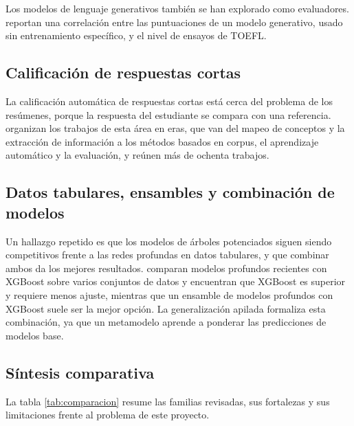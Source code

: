 \documentclass[11pt,a4paper]{article}
\begin{document}
Los modelos de lenguaje generativos también se han explorado como evaluadores. \citet{mizumoto2023} reportan una correlación entre las puntuaciones de un modelo generativo, usado sin entrenamiento específico, y el nivel de ensayos de TOEFL.

\subsection{Calificación de respuestas cortas}

La calificación automática de respuestas cortas está cerca del problema de los resúmenes, porque la respuesta del estudiante se compara con una referencia. \citet{burrows2015} organizan los trabajos de esta área en eras, que van del mapeo de conceptos y la extracción de información a los métodos basados en corpus, el aprendizaje automático y la evaluación, y reúnen más de ochenta trabajos.

\subsection{Datos tabulares, ensambles y combinación de modelos}

Un hallazgo repetido es que los modelos de árboles potenciados siguen siendo competitivos frente a las redes profundas en datos tabulares, y que combinar ambos da los mejores resultados. \citet{shwartz2022} comparan modelos profundos recientes con XGBoost sobre varios conjuntos de datos y encuentran que XGBoost es superior y requiere menos ajuste, mientras que un ensamble de modelos profundos con XGBoost suele ser la mejor opción. La generalización apilada \citep{wolpert1992} formaliza esta combinación, ya que un metamodelo aprende a ponderar las predicciones de modelos base.

\subsection{Síntesis comparativa}

La tabla \ref{tab:comparacion} resume las familias revisadas, sus fortalezas y sus limitaciones frente al problema de este proyecto.
\end{document}
